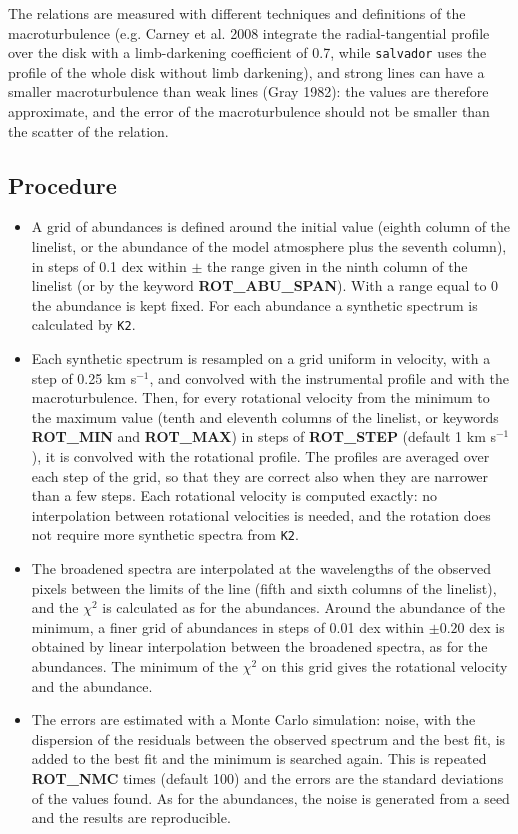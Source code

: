 \documentclass[modern]{aastex701}
\begin{document}
The relations are measured with different techniques and definitions of the macroturbulence (e.g. Carney et al. 2008 integrate the radial-tangential profile over the disk with a limb-darkening coefficient of 0.7, while \texttt{salvador} uses the profile of the whole disk without limb darkening), and strong lines can have a smaller macroturbulence than weak lines (Gray 1982): the values are therefore approximate, and the error of the macroturbulence should not be smaller than the scatter of the relation.

\subsection{Procedure}
\begin{itemize}
    \item A grid of abundances is defined around the initial value (eighth column of the linelist, or the abundance of the model atmosphere plus the seventh column), in steps of 0.1 dex within $\pm$ the range given in the ninth column of the linelist (or by the keyword {\bf ROT\_ABU\_SPAN}). With a range equal to 0 the abundance is kept fixed. For each abundance a synthetic spectrum is calculated by \texttt{K2}.
    \item Each synthetic spectrum is resampled on a grid uniform in velocity, with a step of 0.25 km s$^{-1}$, and convolved with the instrumental profile and with the macroturbulence. Then, for every rotational velocity from the minimum to the maximum value (tenth and eleventh columns of the linelist, or keywords {\bf ROT\_MIN} and {\bf ROT\_MAX}) in steps of {\bf ROT\_STEP} (default 1 km s$^{-1}$), it is convolved with the rotational profile. The profiles are averaged over each step of the grid, so that they are correct also when they are narrower than a few steps. Each rotational velocity is computed exactly: no interpolation between rotational velocities is needed, and the rotation does not require more synthetic spectra from \texttt{K2}.
    \item The broadened spectra are interpolated at the wavelengths of the observed pixels between the limits of the line (fifth and sixth columns of the linelist), and the $\chi^2$ is calculated as for the abundances. Around the abundance of the minimum, a finer grid of abundances in steps of 0.01 dex within $\pm 0.20$ dex is obtained by linear interpolation between the broadened spectra, as for the abundances. The minimum of the $\chi^2$ on this grid gives the rotational velocity and the abundance.
    \item The errors are estimated with a Monte Carlo simulation: noise, with the dispersion of the residuals between the observed spectrum and the best fit, is added to the best fit and the minimum is searched again. This is repeated {\bf ROT\_NMC} times (default 100) and the errors are the standard deviations of the values found. As for the abundances, the noise is generated from a seed and the results are reproducible.

\end{itemize}
\end{document}
